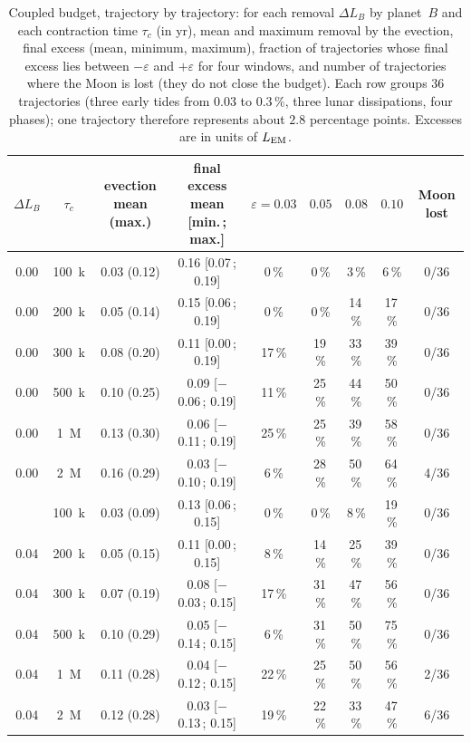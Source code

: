 \documentclass[11pt,a4paper]{article}
\newcommand{\LEM}{\ensuremath{L_{\rm EM}}}
\begin{document}
\begin{table}[htbp]\centering\footnotesize\setlength{\tabcolsep}{3.6pt}
\caption{Coupled budget, trajectory by trajectory: for each removal $\Delta L_B$ by planet~$B$ and each contraction time $\tau_c$ (in yr), mean and maximum removal by the evection, final excess (mean, minimum, maximum), fraction of trajectories whose final excess lies between $-\varepsilon$ and $+\varepsilon$ for four windows, and number of trajectories where the Moon is lost (they do not close the budget). Each row groups $36$ trajectories (three early tides from $0.03$ to $0.3\,\%$, three lunar dissipations, four phases); one trajectory therefore represents about $2.8$ percentage points. Excesses are in units of $\LEM$.\label{tab:couple}}
\begin{tabular}{ccccccccc}\toprule
$\Delta L_B$ & $\tau_c$ & evection mean (max.) & final excess mean [min.\,; max.] & $\varepsilon{=}0.03$ & $0.05$ & $0.08$ & $0.10$ & Moon lost \\
\midrule
0.00 & 100~k & 0.03 (0.12) & 0.16 [0.07\,; 0.19] & 0\,\% & 0\,\% & 3\,\% & 6\,\% & 0/36 \\
0.00 & 200~k & 0.05 (0.14) & 0.15 [0.06\,; 0.19] & 0\,\% & 0\,\% & 14\,\% & 17\,\% & 0/36 \\
0.00 & 300~k & 0.08 (0.20) & 0.11 [0.00\,; 0.19] & 17\,\% & 19\,\% & 33\,\% & 39\,\% & 0/36 \\
0.00 & 500~k & 0.10 (0.25) & 0.09 [$-$0.06\,; 0.19] & 11\,\% & 25\,\% & 44\,\% & 50\,\% & 0/36 \\
0.00 & 1~M & 0.13 (0.30) & 0.06 [$-$0.11\,; 0.19] & 25\,\% & 25\,\% & 39\,\% & 58\,\% & 0/36 \\
0.00 & 2~M & 0.16 (0.29) & 0.03 [$-$0.10\,; 0.19] & 6\,\% & 28\,\% & 50\,\% & 64\,\% & 4/36 \\
\addlinespace
0.04 & 100~k & 0.03 (0.09) & 0.13 [0.06\,; 0.15] & 0\,\% & 0\,\% & 8\,\% & 19\,\% & 0/36 \\
0.04 & 200~k & 0.05 (0.15) & 0.11 [0.00\,; 0.15] & 8\,\% & 14\,\% & 25\,\% & 39\,\% & 0/36 \\
0.04 & 300~k & 0.07 (0.19) & 0.08 [$-$0.03\,; 0.15] & 17\,\% & 31\,\% & 47\,\% & 56\,\% & 0/36 \\
0.04 & 500~k & 0.10 (0.29) & 0.05 [$-$0.14\,; 0.15] & 6\,\% & 31\,\% & 50\,\% & 75\,\% & 0/36 \\
0.04 & 1~M & 0.11 (0.28) & 0.04 [$-$0.12\,; 0.15] & 22\,\% & 25\,\% & 50\,\% & 56\,\% & 2/36 \\
0.04 & 2~M & 0.12 (0.28) & 0.03 [$-$0.13\,; 0.15] & 19\,\% & 22\,\% & 33\,\% & 47\,\% & 6/36 \\

\end{tabular}
\end{table}
\end{document}
